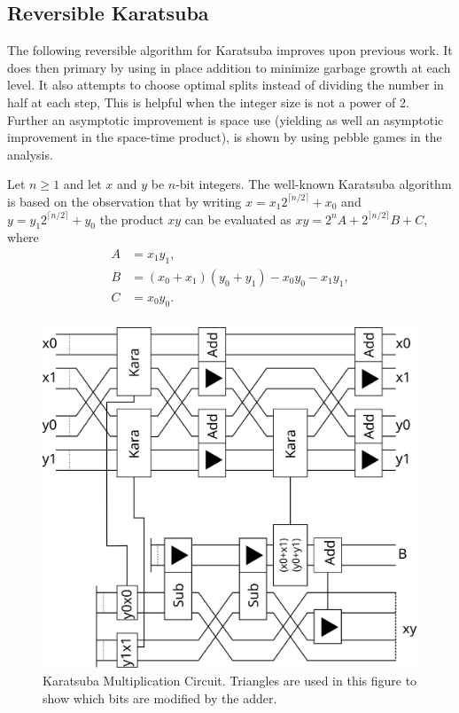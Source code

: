   \subsection{Reversible Karatsuba\label{sec:kara}}

    The following reversible algorithm for Karatsuba improves upon previous
    work\cite{PF:2006}.  It does then primary by using in place addition to
    minimize garbage growth at each level.  It also attempts to choose optimal
    splits instead of dividing the number in half at each step, This is helpful
    when the integer size is not a power of 2. Further an asymptotic
    improvement is space use (yielding as well an asymptotic improvement in the
    space-time product), is shown by using pebble games in the analysis. 

    Let $n\geq 1$ and let $x$ and $y$ be $n$-bit integers.
    The well-known Karatsuba\cite{KO:1963} algorithm is based on the observation that by writing $x=x_1 2^{\lceil n/2\rceil}+x_0$ and $y=y_1 2^{\lceil n/2\rceil }+y_0$ the product $xy$ can be evaluated as $xy=2^n A + 2^{\rceil n/2 \rceil} B + C$, where
    \begin{align*}
      A &= x_1 y_1, \\
      B &= (x_0+x_1)(y_0+y_1) - x_0 y_0 - x_1 y_1,\\
      C &= x_0 y_0. \\
    \end{align*}
    \begin{figure}[ht]
      \capstart
      \centering
      \includegraphics[width=2\textwidth/3]{images/karatsuba2}
      \caption{Karatsuba Multiplication Circuit. Triangles are used in this figure to show which bits are modified by the adder.}
      \label{fig:kara2}
     \end{figure}

